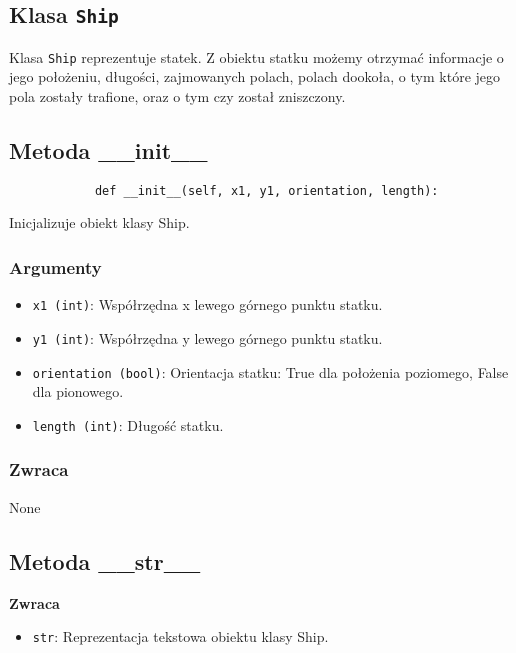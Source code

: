 \documentclass[12pt]{article}
\begin{document}
    \subsection{Klasa \texttt{Ship}}
        Klasa \texttt{Ship} reprezentuje statek. Z obiektu statku możemy otrzymać informacje o jego położeniu, długości, zajmowanych polach, polach dookoła,
        o tym które jego pola zostały trafione, oraz o tym czy został zniszczony.

    \subsection{Metoda \_\_init\_\_}
        \begin{verbatim}
            def __init__(self, x1, y1, orientation, length):
        \end{verbatim}

        Inicjalizuje obiekt klasy Ship.

        \subsubsection*{Argumenty}
            \begin{itemize}
                \item \texttt{x1 (int)}: Współrzędna x lewego górnego punktu statku.
                \item \texttt{y1 (int)}: Współrzędna y lewego górnego punktu statku.
                \item \texttt{orientation (bool)}: Orientacja statku: True dla położenia poziomego, False dla pionowego.
                \item \texttt{length (int)}: Długość statku.
            \end{itemize}

        \subsubsection*{Zwraca}
        None

    \subsection{Metoda \_\_str\_\_}
        \textbf{Zwraca}
        \begin{itemize}
            \item \texttt{str}: Reprezentacja tekstowa obiektu klasy Ship.
        \end{itemize}
        
\end{document}
